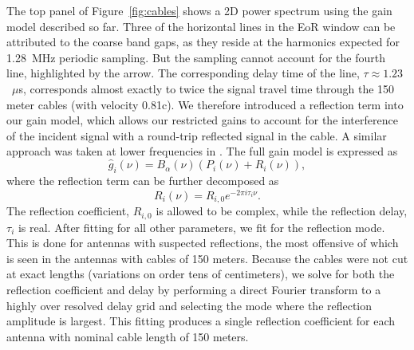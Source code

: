 \documentclass[iop]{emulateapj}
\begin{document}
The top panel of Figure~\ref{fig:cables} shows a 2D power spectrum using the gain model 
described so far. Three of the horizontal lines in the EoR window can be attributed to the 
coarse band gaps, as they reside at the harmonics expected for 1.28~MHz periodic 
sampling. But the sampling cannot account for the fourth line, highlighted by the arrow. The 
corresponding delay time of the line, $\tau \approx 1.23$~$\mu$s, corresponds almost 
exactly to twice the signal travel time through the 150 meter cables (with velocity 0.81c). We 
therefore introduced a reflection term into our gain model, which allows our restricted gains 
to account for the interference of the incident signal with a round-trip reflected signal in the 
cable. 
A similar approach was taken at lower frequencies in \citealt{Ewall-Wice:2016}.
The full gain model is expressed as
\begin{equation}\label{eq:cal2}
\hat{g}_i(\nu)=B_{\alpha}(\nu)\left(P_i(\nu)+R_i(\nu)\right),
\end{equation}
where the reflection term can be further decomposed as
\begin{equation}
R_i(\nu) = R_{i,0} e^{-2\pi i \tau_{i} \nu}.
\end{equation}
The reflection coefficient, $R_{i,0}$ is allowed to be complex, while the reflection delay, 
$\tau_i$ is real. After fitting for all other parameters, we fit for the reflection mode. This is 
done for antennas with suspected reflections, the most offensive of which is seen in the 
antennas with cables of 150 meters. Because the cables were not cut at exact lengths 
(variations on order tens of centimeters), we solve for both the reflection coefficient and 
delay by performing a direct Fourier transform to a highly over resolved delay grid and 
selecting the mode where the reflection amplitude is largest. 
This fitting produces a single reflection coefficient for each antenna with nominal cable
length of 150 meters.
\end{document}
